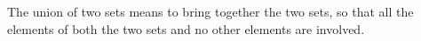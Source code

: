 The union of two sets means to bring together the two sets, 
so that all the elements of both the two sets and no other elements are involved.